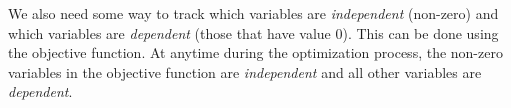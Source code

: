 We also need some way to track which variables are \emph{independent} (non-zero) and which variables are \emph{dependent} (those that have value $0$). This can be done using the objective function. At anytime during the optimization process, the non-zero variables in the objective function are \emph{independent} and all other variables are \emph{dependent}. 









